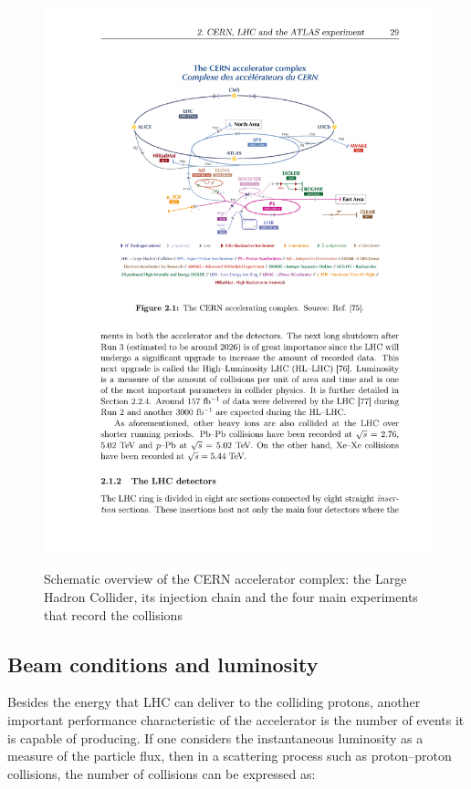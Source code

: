 \begin{figure}[htbp]
    \centering
    \includegraphics[width=1\linewidth]{images/CCC-v2022}\\
    \caption{Schematic overview of the CERN accelerator complex: the Large Hadron Collider, its injection chain and the four main experiments that record the collisions~\cite{Lopienska:2800984}}
    \label{LHC:chain}
\end{figure}


\subsection*{Beam conditions and luminosity}

Besides the energy that LHC can deliver to the colliding protons, another important performance characteristic of the accelerator is the number of events it is capable of producing. If one considers the instantaneous luminosity as a measure of the particle flux, then in a scattering process such as proton--proton collisions, the number of collisions can be expressed as:

